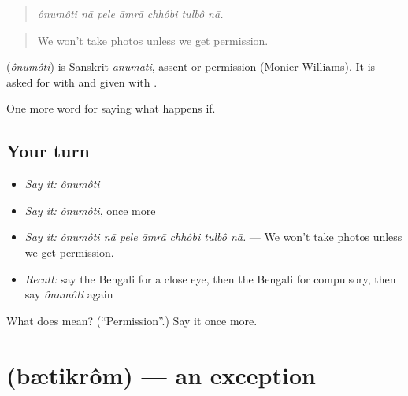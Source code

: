 \begin{quote}
      
\end{quote}

\begin{quote}
\emph{ônumôti nā pele āmrā chhôbi tulbô nā.}
\end{quote}

\begin{quote}
We won't take photos unless we get permission.
\end{quote}

\begin{cousinweb}
\textbf{} (\emph{ônumôti}) is Sanskrit \emph{anumati}, assent or permission (Monier-Williams). It is asked for with  and given with .
\end{cousinweb}

\begin{grammarlens}[title={What you've built}]
One more word for saying what happens if.
\end{grammarlens}

\subsection*{Your turn}
\begin{itemize}
\raggedright
  \item \emph{Say it:} \emph{ônumôti}
  \item \emph{Say it:} \emph{ônumôti}, once more
  \item \emph{Say it:} \emph{ônumôti nā pele āmrā chhôbi tulbô nā.} — We won't take photos unless we get permission.
  \item \emph{Recall:} say the Bengali for a close eye, then the Bengali for compulsory, then say \emph{ônumôti} again
\end{itemize}

\begin{tcolorbox}[breakable,colback=teal!4,colframe=teal!35!black,title={Before you move on}]
What does  mean? (\textquotedblleft{}Permission\textquotedblright{}.) Say it once more.
\end{tcolorbox}
\section[\texorpdfstring{\bn{ব্যতিক্রম} (bætikrôm)}{ব্যতিক্রম (bætikrôm)}]{ (bætikrôm) — an exception}

\label{lesson:BN-C375-betikrom}



